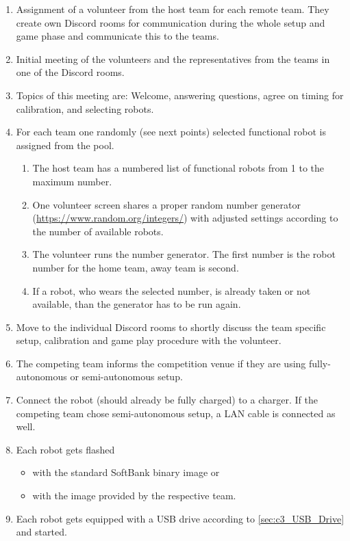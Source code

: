     \begin{enumerate}
        \item Assignment of a volunteer from the host team for each remote team. They create own Discord rooms for communication during the whole setup and game phase and communicate this to the teams.
        \item Initial meeting of the volunteers and the representatives from the teams in one of the Discord rooms.
        \item Topics of this meeting are: Welcome, answering questions, agree on timing for calibration, and selecting robots.
		\item For each team one randomly (see next points) selected functional robot is assigned from the pool.
		\begin{enumerate}
            \item The host team has a numbered list of functional robots from 1 to the maximum number.
            \item One volunteer screen shares a proper random number generator (\url{https://www.random.org/integers/}) with adjusted settings according to the number of available robots.
            \item The volunteer runs the number generator. The first number is the robot number for the home team, away team is second.
            \item If a robot, who wears the selected number, is already taken or not available, than the generator has to be run again. 
        \end{enumerate} 
        \item Move to the individual Discord rooms to shortly discuss the team specific setup, calibration and game play procedure with the volunteer.
        \item The competing team informs the competition venue if they are using fully-autonomous or semi-autonomous setup.
        \item Connect the robot (should already be fully charged) to a charger. If the competing team chose semi-autonomous setup, a LAN cable is connected as well.
        \item Each robot gets flashed 
        \begin{itemize}
            \item with the standard SoftBank binary image or
            \item with the image provided by the respective team.
		\end{itemize}
		\item Each robot gets equipped with a USB drive according to \ref{sec:c3_USB_Drive} and started.

\end{enumerate}
